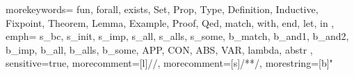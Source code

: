 
{
  morekeywords={
    fun,
    forall,
    exists,
    Set,
    Prop,
    Type,
    Definition,
    Inductive,
    Fixpoint,
    Theorem,
    Lemma,
    Example,
    Proof,
    Qed,
    match,
    with,
    end,
    let,
    in
  },
  emph={
    s_bc, s_init, s_imp, s_all, s_alls, s_some,
    b_match, b_and1, b_and2, b_imp, b_all, b_alls, b_some,
    APP, CON, ABS, VAR, lambda, abstr
    },
  sensitive=true, %
  morecomment=[l]{//}, %
  morecomment=[s]{/*}{*/}, %
  morestring=[b]" %
}
 



\newcommand{\type}[1]{\texttt{Type\ensuremath{_{#1}}}}
\newcommand{\N}{\ensuremath{\mathbb{N}}}
\newcommand{\Z}{\ensuremath{\mathbb{Z}}}
\newcommand{\cic}{\textsc{Cic}}
\newcommand{\coc}{\textsc{CoC}}
\newcommand{\reduce}{\; \triangleright_{\beta\delta\iota\zeta} \;}
\newcommand{\subtype}{\leq_{\beta\delta\iota\zeta}}

\newcommand{\poplmark}{\textsc{POPLmark}}

\newcommand{\pfshift}{-5pt}

